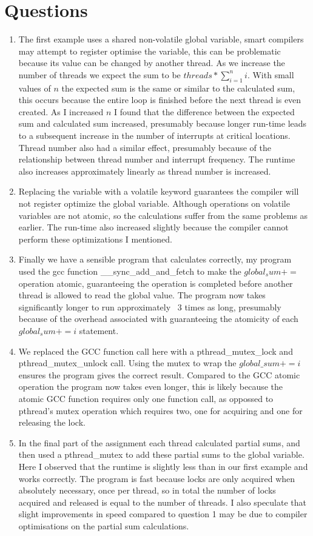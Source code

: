 \documentclass[12pt]{article}
\begin{document}
\section{Questions} 
\begin{enumerate}
\item The first example uses a shared non-volatile global variable, smart compilers may attempt to register optimise the variable, this can be problematic because its
    value can be changed by another thread. As we increase the number of threads we expect the sum to be $ threads * \sum_{i=1}^{n} i$. With small values of $ n $
    the expected sum is the same or similar to the calculated sum, this occurs because the entire loop is finished before the next thread is even created. As I increased $ n $ I found that the difference between the expected sum and calculated sum increased, presumably because longer run-time leads to a subsequent increase in the number of interrupts at critical locations. Thread number also had a similar effect, presumably because of the relationship between thread number and interrupt frequency. The runtime also increases approximately linearly as thread number is increased. 
    
\item Replacing the variable with a volatile keyword guarantees the compiler will not register optimize the global variable. Although operations on volatile variables are not atomic, so the calculations suffer from the same problems as earlier. The run-time also increased slightly because the compiler cannot perform these optimizations I mentioned. 
\item
    Finally we have a sensible program that calculates correctly, my program used the gcc function \_\_sync\_add\_and\_fetch\(\) to make the $ global_sum +=  $ operation atomic, guaranteeing the operation is completed before another thread is allowed to read the global value. The program now takes significantly longer to run approximately ~3 times as long, presumably because of the overhead associated with guaranteeing the atomicity of each $ global_sum += i $ statement. 
\item 
    We replaced the GCC function call here with a pthread\_mutex\_lock and pthread\_mutex\_unlock call. Using the mutex to wrap the $ global\_sum += i $ ensures the program gives the correct result. Compared to the GCC atomic operation the program now takes even longer, this is likely because the atomic GCC function requires only one function call, as oppossed to pthread's mutex operation which requires two, one for acquiring and one for releasing the lock.  
\item
    In the final part of the assignment each thread calculated partial sums, and then used a pthread\_mutex to add these partial sums to the global variable. Here I observed that the runtime is slightly less than in our first example and works correctly. The program is fast because locks are only acquired when absolutely necessary, once per thread, so in total the number of locks acquired and released is equal to the number of threads. I also speculate that slight improvements in speed compared to question 1 may be due to compiler optimisations on the partial sum calculations.  
            
\end{enumerate} 
\end{document}
